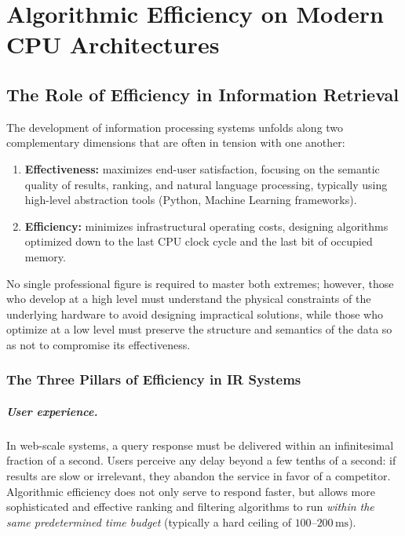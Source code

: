 \chapter{Algorithmic Efficiency on Modern CPU Architectures}
\label{chap:efficienza-cpu}

\FloatBarrier
\section{The Role of Efficiency in Information Retrieval}

The development of information processing systems unfolds along two complementary dimensions that are often in tension with one another:

\begin{enumerate}
    \item \textbf{Effectiveness:} maximizes end-user satisfaction, focusing on the semantic quality of results, ranking, and natural language processing, typically using high-level abstraction tools (Python, Machine Learning frameworks).
    \item \textbf{Efficiency:} minimizes infrastructural operating costs, designing algorithms optimized down to the last CPU clock cycle and the last bit of occupied memory.
\end{enumerate}

No single professional figure is required to master both extremes; however, those who develop at a high level must understand the physical constraints of the underlying hardware to avoid designing impractical solutions, while those who optimize at a low level must preserve the structure and semantics of the data so as not to compromise its effectiveness.

\subsection{The Three Pillars of Efficiency in IR Systems}

\paragraph{User experience.} In web-scale systems, a query response must be delivered within an infinitesimal fraction of a second. Users perceive any delay beyond a few tenths of a second: if results are slow or irrelevant, they abandon the service in favor of a competitor. Algorithmic efficiency does not only serve to respond faster, but allows more sophisticated and effective ranking and filtering algorithms to run \emph{within the same predetermined time budget} (typically a hard ceiling of $100$--$200\,\text{ms}$).

